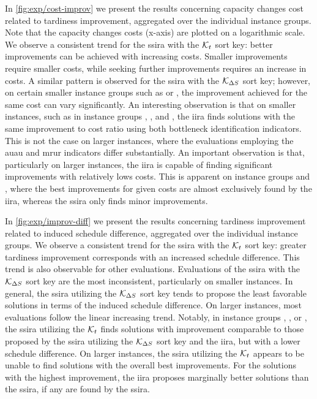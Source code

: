 In \cref{fig:exp/cost-improv} we present the results concerning
capacity changes cost related to tardiness improvement, aggregated over the individual instance groups.
Note that the capacity changes costs (x-axis) are plotted on a logarithmic scale.
We observe a consistent trend for the \ac{ssira} with the $\mathcal{K}_{t}$ sort key:
better improvements can be achieved with increasing costs.
Smaller improvements require smaller costs,
while seeking further improvements requires an increase in costs.
A similar pattern is observed for the \ac{ssira} with the $\mathcal{K}_{\Delta S_{}}$ sort key;
however, on certain smaller instance groups such as  or ,
the improvement achieved for the same cost can vary significantly.
An interesting observation is that on smaller instances,
such as in instance groups , , and ,
the \ac{iira} finds solutions with the same improvement to cost ratio
using both bottleneck identification indicators.
This is not the case on larger instances,
where the evaluations employing the \ac{auau} and \ac{mrur} indicators differ substantially.
An important observation is that, particularly on larger instances,
the \ac{iira} is capable of finding significant improvements with relatively lows costs.
This is apparent on instance groups  and ,
where the best improvements for given costs are almost exclusively found by the \ac{iira},
whereas the \ac{ssira} only finds minor improvements.

In \cref{fig:exp/improv-diff} we present the results concerning
tardiness improvement related to induced schedule difference, aggregated over the individual instance groups.
We observe a consistent trend for the \ac{ssira} with the $\mathcal{K}_{t}$ sort key:
greater tardiness improvement corresponds with an increased schedule difference.
This trend is also observable for other evaluations.
Evaluations of the \ac{ssira} with the $\mathcal{K}_{\Delta S_{}}$ sort key are the most inconsistent,
particularly on smaller instances.
In general, the \ac{ssira} utilizing the $\mathcal{K}_{\Delta S_{}}$ sort key tends to propose
the least favorable solutions in terms of the induced schedule difference.
On larger instances, most evaluations follow the linear increasing trend.
Notably, in instance groups , , or ,
the \ac{ssira} utilizing the $\mathcal{K}_{t}$ finds solutions with improvement comparable
to those proposed by the \ac{ssira} utilizing the $\mathcal{K}_{\Delta S_{}}$ sort key
and the \ac{iira},
but with a lower schedule difference.
On larger instances, the \ac{ssira} utilizing the $\mathcal{K}_{t}$ appears to be unable to find
solutions with the overall best improvements.
For the solutions with the highest improvement,
the \ac{iira} proposes marginally better solutions than the \ac{ssira},
if any are found by the \ac{ssira}.

